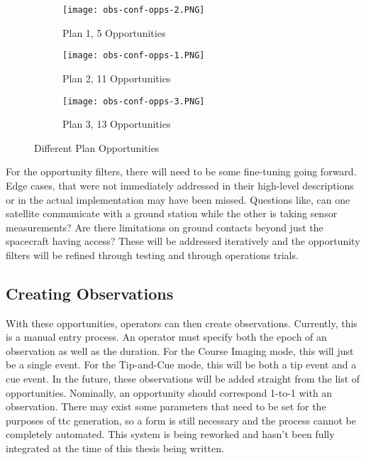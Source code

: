 \begin{figure}[h]
    \centering
    \begin{subfigure}[b]{0.32\textwidth}
	\centering
	\texttt{[image: obs-conf-opps-2.PNG]} 
	\caption{Plan 1, 5 Opportunities}
	\label{fig:obs-conf-opps-1}
    \end{subfigure}
    \hfill
    \begin{subfigure}[b]{0.32\textwidth}
	\centering
	\texttt{[image: obs-conf-opps-1.PNG]} 
	\caption{Plan 2, 11 Opportunities}
	\label{fig:obs-conf-opps-2} 
    \end{subfigure}
    \hfill
    \begin{subfigure}[b]{0.32\textwidth}
	\centering
	\texttt{[image: obs-conf-opps-3.PNG]} 
	\caption{Plan 3, 13 Opportunities}
	\label{fig:obs-conf-opps-3} 
    \end{subfigure}

    \caption{Different Plan Opportunities}
    \label{fig:obs-conf-opps}
\end{figure}

For the opportunity filters, there will need to be some fine-tuning going
forward. Edge cases, that were not immediately addressed in their high-level
descriptions or in the actual implementation may have been missed. Questions
like, can one satellite communicate with a ground station while the other is
taking sensor measurements? Are there limitations on ground contacts beyond
just the spacecraft having access? These will be addressed iteratively and the
opportunity filters will be refined through testing and through operations
trials.

\subsection{Creating Observations}

With these opportunities, operators can then create observations. Currently,
this is a manual entry process. An operator must specify both the epoch of an
observation as well as the duration. For the Course Imaging mode, this will
just be a single event. For the Tip-and-Cue mode, this will be both a tip event
and a cue event. In the future, these observations will be added straight from
the list of opportunities. Nominally, an opportunity should correspond 1-to-1
with an observation. There may exist some parameters that need to be set for
the purposes of \gls{ttc} generation, so a form is still necessary and the
process cannot be completely automated. This system is being reworked and
hasn't been fully integrated at the time of this thesis being written.


